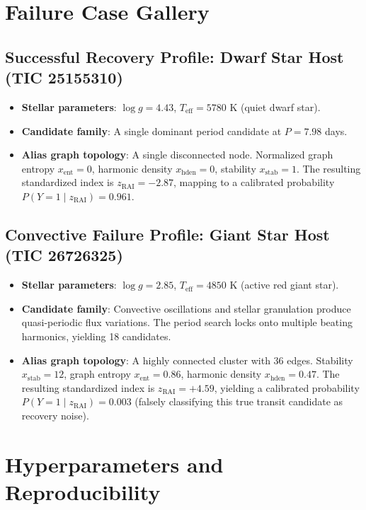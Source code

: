 \section{Failure Case Gallery} \label{sec:app_failures}

\subsection{Successful Recovery Profile: Dwarf Star Host (TIC 25155310)} \label{sec:app_success_case}
\begin{itemize}
\item \textbf{Stellar parameters}: $\log g = 4.43$, $T_{\text{eff}} = 5780$ K (quiet dwarf star).
\item \textbf{Candidate family}: A single dominant period candidate at $P = 7.98$ days.
\item \textbf{Alias graph topology}: A single disconnected node. Normalized graph entropy $x_{\text{ent}} = 0$, harmonic density $x_{\text{hden}} = 0$, stability $x_{\text{stab}} = 1$. The resulting standardized index is $z_{\text{RAI}} = -2.87$, mapping to a calibrated probability $P(Y=1 \mid z_{\text{RAI}}) = 0.961$.
\end{itemize}

\subsection{Convective Failure Profile: Giant Star Host (TIC 26726325)} \label{sec:app_failure_case}
\begin{itemize}
\item \textbf{Stellar parameters}: $\log g = 2.85$, $T_{\text{eff}} = 4850$ K (active red giant star).
\item \textbf{Candidate family}: Convective oscillations and stellar granulation produce quasi-periodic flux variations. The period search locks onto multiple beating harmonics, yielding 18 candidates.
\item \textbf{Alias graph topology}: A highly connected cluster with 36 edges. Stability $x_{\text{stab}} = 12$, graph entropy $x_{\text{ent}} = 0.86$, harmonic density $x_{\text{hden}} = 0.47$. The resulting standardized index is $z_{\text{RAI}} = +4.59$, yielding a calibrated probability $P(Y=1 \mid z_{\text{RAI}}) = 0.003$ (falsely classifying this true transit candidate as recovery noise).
\end{itemize}

\section{Hyperparameters and Reproducibility} \label{sec:app_reproducibility}

